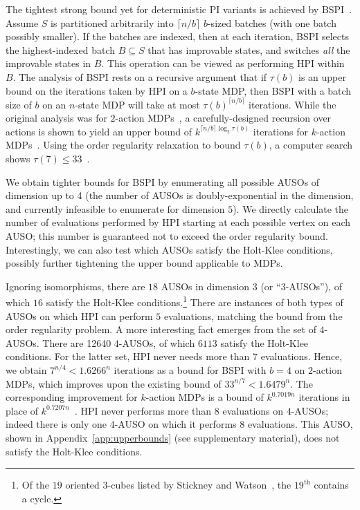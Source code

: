 The tightest strong bound yet for deterministic PI variants is achieved by
BSPI~\cite{Kalyanakrishnan+MG-bspi:2016}. Assume $S$ is partitioned arbitrarily into $\lceil n/b \rceil$ $b$-sized batches (with one batch possibly smaller). If the batches are indexed, then at each iteration, 
BSPI selects the highest-indexed batch $B \subseteq S$ that has improvable states, and switches \textit{all} the improvable states in $B$. This operation can be viewed as performing HPI within $B$. The analysis of BSPI rests on a recursive argument that if $\tau(b)$ is an upper bound on the iterations taken by HPI on a $b$-state MDP, then BSPI with a batch size of $b$ on an $n$-state MDP will take at most $\tau(b)^{\lceil n/b \rceil}$ iterations. While the original analysis was for $2$-action MDPs~\cite{Kalyanakrishnan+MG-bspi:2016}, a carefully-designed recursion over actions is shown to yield an upper bound of $k^{\lceil n/b \rceil \log_{2}\tau(b)}$ iterations for $k$-action MDPs~\cite{Kalyanakrishnan+Gupta}. Using the order regularity relaxation to bound $\tau(b)$, a computer search shows $\tau(7) \leq 33$~\cite{Gerencser+HDJ:2015}.

We obtain tighter bounds for BSPI by enumerating all possible AUSOs of dimension up to 4 (the number of AUSOs is doubly-exponential in the dimension, and currently infeasible to enumerate for dimension $5$). We directly calculate the number of evaluations performed by HPI starting at each possible vertex on each AUSO; this number is guaranteed not to exceed the order regularity bound. Interestingly, we can also test which AUSOs satisfy the Holt-Klee conditions, possibly further tightening the upper bound applicable to MDPs.

Ignoring isomorphisms, there are $18$ AUSOs in dimension $3$ (or ``$3$-AUSOs''), of which $16$ satisfy the Holt-Klee conditions.\footnote{Of the $19$ oriented $3$-cubes listed by Stickney and Watson~, the $19^{\text{th}}$ contains a cycle.} There are instances of both types of AUSOs on which HPI can perform $5$ evaluations, matching the bound from the order regularity problem. A more interesting fact emerges from the set of $4$-AUSOs. There are 12640 $4$-AUSOs, of which $6113$ satisfy the Holt-Klee conditions. For the latter set, HPI never needs more than $7$ evaluations. Hence, we obtain $7^{n/4} < 1.6266^{n}$ iterations as a bound for BSPI with $b = 4$ on $2$-action MDPs, which improves upon the existing bound of $33^{n/7} < 1.6479^{n}$. The corresponding improvement for $k$-action MDPs is a bound of $k^{0.7019n}$ iterations in place of $k^{0.7207n}$~\cite{Kalyanakrishnan+Gupta}. HPI never performs more than $8$ evaluations on $4$-AUSOs; indeed there is only one $4$-AUSO on which it performs $8$ evaluations. This AUSO, shown in Appendix~\ref{app:upperbounds} (see supplementary material), does not satisfy the Holt-Klee conditions.


